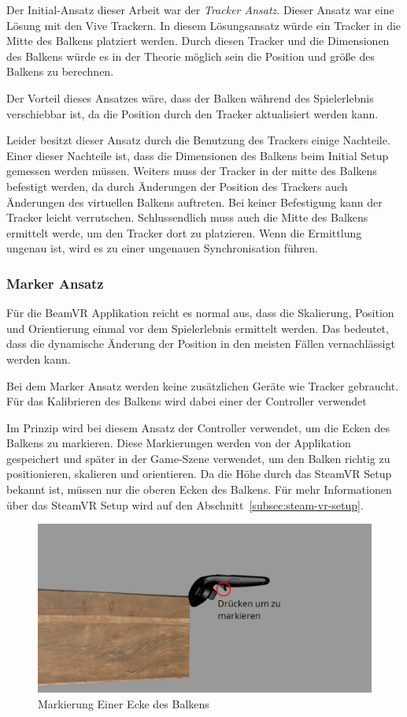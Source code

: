 Der Initial-Ansatz dieser Arbeit war der \emph{Tracker Ansatz}.
Dieser Ansatz war eine Lösung mit den Vive Trackern.
In diesem Lösungsansatz würde ein Tracker in die Mitte des Balkens platziert werden.
Durch diesen Tracker und die Dimensionen des Balkens würde es in der Theorie möglich sein die Position und größe des Balkens zu berechnen.

Der Vorteil dieses Ansatzes wäre, dass der Balken während des Spielerlebnis verschiebbar ist, da die Position durch den Tracker aktualisiert werden kann.

Leider besitzt dieser Ansatz durch die Benutzung des Trackers einige Nachteile.
Einer dieser Nachteile ist, dass die Dimensionen des Balkens beim Initial Setup gemessen werden müssen.
Weiters muss der Tracker in der mitte des Balkens befestigt werden, da durch Änderungen der Position des Trackers auch Änderungen des virtuellen Balkens auftreten.
Bei keiner Befestigung kann der Tracker leicht verrutschen.
Schlussendlich muss auch die Mitte des Balkens ermittelt werde, um den Tracker dort zu platzieren.
Wenn die Ermittlung ungenau ist, wird es zu einer ungenauen Synchronisation führen.

\subsubsection{Marker Ansatz}

Für die BeamVR Applikation reicht es normal aus, dass die Skalierung, Position und Orientierung einmal vor dem Spielerlebnis ermittelt werden.
Das bedeutet, dass die dynamische Änderung der Position in den meisten Fällen vernachlässigt werden kann.

Bei dem Marker Ansatz werden keine zusätzlichen Geräte wie Tracker gebraucht.
Für das Kalibrieren des Balkens wird dabei einer der Controller verwendet

Im Prinzip wird bei diesem Ansatz der Controller verwendet, um die Ecken des Balkens zu markieren.
Diese Markierungen werden von der Applikation gespeichert und später in der Game-Szene verwendet, um den Balken richtig zu positionieren, skalieren und orientieren.
Da die Höhe durch das SteamVR Setup bekannt ist, müssen nur die oberen Ecken des Balkens.
Für mehr Informationen über das SteamVR Setup wird auf den Abschnitt~\ref{subsec:steam-vr-setup}.

\begin{figure}
    \centering
    \includegraphics[scale=0.3]{pics/beam_mark}
    \caption{Markierung Einer Ecke des Balkens}
    \label{fig:beam-mark}
\end{figure}

